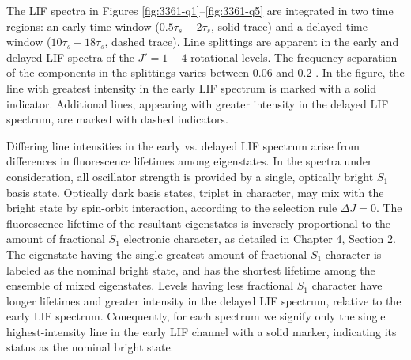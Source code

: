 \documentclass[12pt]{mitthesis}
\begin{document}
The LIF spectra in Figures \ref{fig:3361-q1}--\ref{fig:3361-q5} are
integrated in two time regions: an early time window
($0.5\tau_s-2\tau_s$, solid trace) and a delayed time window
($10\tau_s-18\tau_s$, dashed trace).  Line splittings are apparent in
the early and delayed LIF spectra of the $J'=1-4$ rotational levels.
The frequency separation of the components in the splittings varies
between 0.06 and 0.2 \rcm.  In the figure, the line with greatest
intensity in the early LIF spectrum is marked with a solid indicator.
Additional lines, appearing with greater intensity in the delayed LIF
spectrum, are marked with dashed indicators.

Differing line intensities in the early vs. delayed LIF spectrum arise
from differences in fluorescence lifetimes among eigenstates.  In the
spectra under consideration, all oscillator strength is provided by a
single, optically bright $S_1$ basis state.  Optically dark basis
states, triplet in character, may mix with the bright state by
spin-orbit interaction, according to the selection rule $\Delta J =
0$.  The fluorescence lifetime of the resultant eigenstates is
inversely proportional to the amount of fractional $S_1$ electronic
character, as detailed in Chapter 4, Section 2.  The eigenstate having
the single greatest amount of fractional $S_1$ character is labeled as
the nominal bright state, and has the shortest lifetime among the
ensemble of mixed eigenstates.  Levels having less fractional $S_1$
character have longer lifetimes and greater intensity in the delayed
LIF spectrum, relative to the early LIF spectrum.  Conequently, for
each spectrum we signify only the single highest-intensity line in the
early LIF channel with a solid marker, indicating its status as the
nominal bright state.

\end{document}
